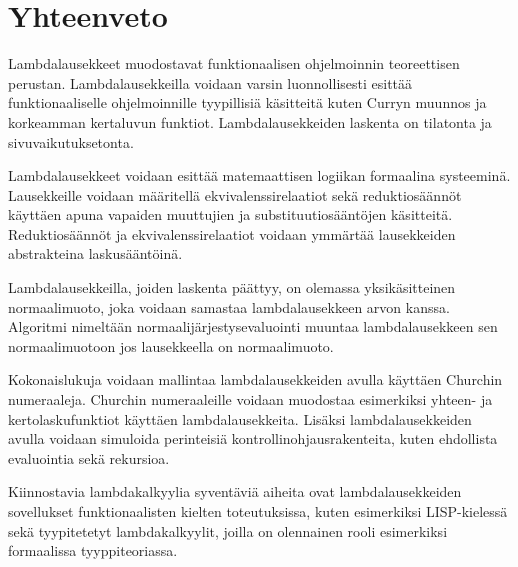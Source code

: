 \section{Yhteenveto}

Lambdalausekkeet muodostavat funktionaalisen ohjelmoinnin teoreettisen perustan. Lambdalausekkeilla voidaan varsin luonnollisesti esittää funktionaaliselle ohjelmoinnille tyypillisiä käsitteitä kuten Curryn muunnos ja korkeamman kertaluvun funktiot. Lambdalausekkeiden laskenta on tilatonta ja sivuvaikutuksetonta. 

\par

Lambdalausekkeet voidaan esittää matemaattisen logiikan formaalina systeeminä. Lausekkeille voidaan määritellä ekvivalenssirelaatiot sekä reduktiosäännöt käyttäen apuna vapaiden muuttujien ja substituutiosääntöjen käsitteitä. Reduktiosäännöt ja ekvivalenssirelaatiot voidaan ymmärtää lausekkeiden abstrakteina laskusääntöinä.

\par

Lambdalausekkeilla, joiden laskenta päättyy, on olemassa yksikäsitteinen normaalimuoto, joka voidaan samastaa lambdalausekkeen arvon kanssa. Algoritmi nimeltään normaalijärjestysevaluointi muuntaa lambdalausekkeen sen normaalimuotoon jos lausekkeella on normaalimuoto. 

\par

Kokonaislukuja voidaan mallintaa lambdalausekkeiden avulla käyttäen Churchin numeraaleja. Churchin numeraaleille voidaan muodostaa esimerkiksi yhteen- ja kertolaskufunktiot käyttäen lambdalausekkeita. Lisäksi lambdalausekkeiden avulla voidaan simuloida perinteisiä kontrollinohjausrakenteita, kuten ehdollista evaluointia sekä rekursioa.

\par 

Kiinnostavia lambdakalkyylia syventäviä aiheita ovat lambdalausekkeiden sovellukset funktionaalisten kielten toteutuksissa, kuten esimerkiksi LISP-kielessä sekä tyypitetetyt lambdakalkyylit, joilla on olennainen rooli esimerkiksi formaalissa tyyppiteoriassa.